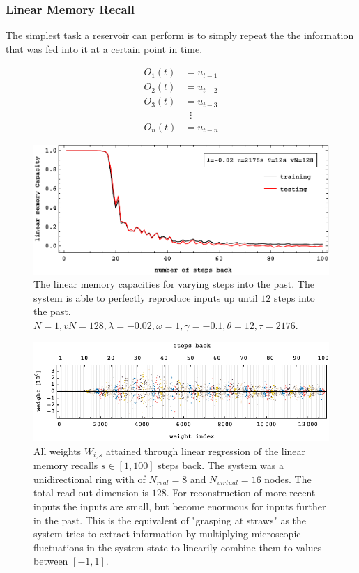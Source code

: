 \subsubsection{Linear Memory Recall}
The simplest task a reservoir can perform is to simply repeat the the information that was fed into it at a certain point in time. 

	\begin{equation}
		\begin{split}
		O_{1}(t) & = u_{t - 1} \\
		O_{2}(t) & = u_{t - 2} \\				
		O_{3}(t) & = u_{t - 3} \\
				 &\;\; \vdots \\
		O_{n}(t) & = u_{t - n}
		\end{split}
		\label{eq:linear_recall_task}
	\end{equation}


\begin{figure}
	\centering
	\includegraphics[width=0.99\linewidth]{pics/linearMemoryCurveN1}
	\caption{The linear memory capacities for varying steps into the past. The system is able to perfectly reproduce inputs up until $12$ steps into the past. $N=1, vN=128, \lambda=-0.02, \omega=1, \gamma=-0.1, \theta=12, \tau=2176$. }
	\label{fig:linearMemoryRecallCurveN1}
\end{figure}

\begin{figure}
	\centering
	\includegraphics[width=0.99\linewidth]{pics/weight_plot}
	\caption{All weights $W_{i,s}$ attained through linear regression of the linear memory recalls $s \in [1,100]$ steps back. The system was a unidirectional ring with of $N_{real}=8$ and $N_{virtual}=16$ nodes. The total read-out dimension is $128$. For reconstruction of more recent inputs the inputs are small, but become enormous for inputs further in the past. This is the equivalent of "grasping at straws" as the system tries to extract information by multiplying microscopic fluctuations in the system state to linearily combine them to values between $[-1,1]$.}
	\label{fig:linearMemoryRecallWeights}
\end{figure}


